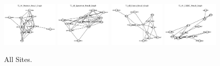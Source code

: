 \begin{figure}
    \includegraphics[width=0.24\textwidth]{diss/7_cond/figs/T1_All_Pearson_Result_Graph.png}
    \includegraphics[width=0.24\textwidth]{diss/7_cond/figs/T1_All_Spearman_Result_Graph.png}
    \includegraphics[width=0.24\textwidth]{diss/7_cond/figs/T1_All_Glasso_Result_Graph.png}
    \includegraphics[width=0.24\textwidth]{diss/7_cond/figs/T1_All_CODEC_Result_Graph.png}
    \caption{All Sites.}
    \label{fig:all}
\end{figure}

